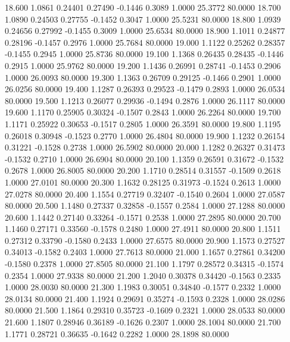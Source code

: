   18.600   1.0861   0.24401   0.27490  -0.1446   0.3089   1.0000  25.3772  80.0000
  18.700   1.0890   0.24503   0.27755  -0.1452   0.3047   1.0000  25.5231  80.0000
  18.800   1.0939   0.24656   0.27992  -0.1455   0.3009   1.0000  25.6534  80.0000
  18.900   1.1011   0.24877   0.28196  -0.1457   0.2976   1.0000  25.7684  80.0000
  19.000   1.1122   0.25262   0.28357  -0.1455   0.2945   1.0000  25.8736  80.0000
  19.100   1.1368   0.26435   0.28435  -0.1446   0.2915   1.0000  25.9762  80.0000
  19.200   1.1436   0.26991   0.28741  -0.1453   0.2906   1.0000  26.0093  80.0000
  19.300   1.1363   0.26709   0.29125  -0.1466   0.2901   1.0000  26.0256  80.0000
  19.400   1.1287   0.26393   0.29523  -0.1479   0.2893   1.0000  26.0534  80.0000
  19.500   1.1213   0.26077   0.29936  -0.1494   0.2876   1.0000  26.1117  80.0000
  19.600   1.1170   0.25905   0.30324  -0.1507   0.2843   1.0000  26.2264  80.0000
  19.700   1.1171   0.25922   0.30653  -0.1517   0.2805   1.0000  26.3591  80.0000
  19.800   1.1195   0.26018   0.30948  -0.1523   0.2770   1.0000  26.4804  80.0000
  19.900   1.1232   0.26154   0.31221  -0.1528   0.2738   1.0000  26.5902  80.0000
  20.000   1.1282   0.26327   0.31473  -0.1532   0.2710   1.0000  26.6904  80.0000
  20.100   1.1359   0.26591   0.31672  -0.1532   0.2678   1.0000  26.8005  80.0000
  20.200   1.1710   0.28514   0.31557  -0.1509   0.2618   1.0000  27.0101  80.0000
  20.300   1.1632   0.28125   0.31973  -0.1524   0.2613   1.0000  27.0278  80.0000
  20.400   1.1554   0.27719   0.32407  -0.1540   0.2604   1.0000  27.0587  80.0000
  20.500   1.1480   0.27337   0.32858  -0.1557   0.2584   1.0000  27.1288  80.0000
  20.600   1.1442   0.27140   0.33264  -0.1571   0.2538   1.0000  27.2895  80.0000
  20.700   1.1460   0.27171   0.33560  -0.1578   0.2480   1.0000  27.4911  80.0000
  20.800   1.1511   0.27312   0.33790  -0.1580   0.2433   1.0000  27.6575  80.0000
  20.900   1.1573   0.27527   0.34013  -0.1582   0.2403   1.0000  27.7613  80.0000
  21.000   1.1657   0.27861   0.34200  -0.1580   0.2378   1.0000  27.8505  80.0000
  21.100   1.1797   0.28572   0.34315  -0.1574   0.2354   1.0000  27.9338  80.0000
  21.200   1.2040   0.30378   0.34420  -0.1563   0.2335   1.0000  28.0030  80.0000
  21.300   1.1983   0.30051   0.34840  -0.1577   0.2332   1.0000  28.0134  80.0000
  21.400   1.1924   0.29691   0.35274  -0.1593   0.2328   1.0000  28.0286  80.0000
  21.500   1.1864   0.29310   0.35723  -0.1609   0.2321   1.0000  28.0533  80.0000
  21.600   1.1807   0.28946   0.36189  -0.1626   0.2307   1.0000  28.1004  80.0000
  21.700   1.1771   0.28721   0.36635  -0.1642   0.2282   1.0000  28.1898  80.0000
